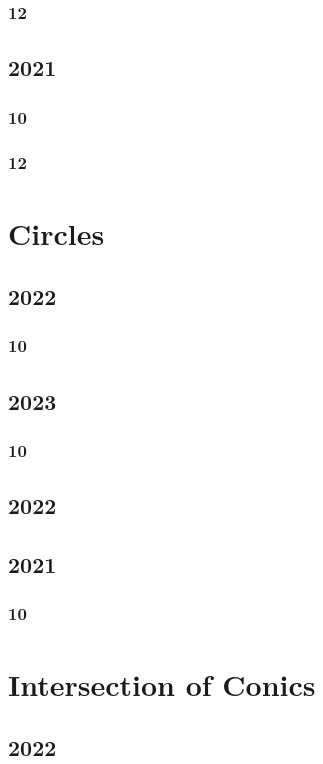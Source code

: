 \documentclass[11pt]{book}
\begin{document}
\subsection{12}

\section{2021}
\subsection{10}

\subsection{12}

\chapter{Circles}
\section{2022}
\subsection{10}

\section{2023}
\subsection{10}

\section{2022}

\section{2021}
\subsection{10}

\chapter{Intersection of Conics}
\section{2022}

\end{document}
